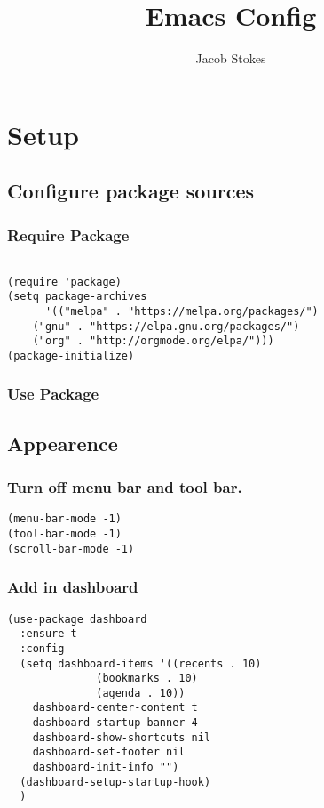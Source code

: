\documentclass[11pt]{article}
\author{Jacob Stokes}
\date{}
\title{Emacs Config}
\begin{document}
\maketitle
\tableofcontents

\section{Setup}
\label{sec:orgc369e85}
\subsection{Configure package sources}
\label{sec:orgfdca1f1}
\subsubsection{Require Package}
\label{sec:org8fe10ee}
\begin{verbatim}

(require 'package)
(setq package-archives
      '(("melpa" . "https://melpa.org/packages/")
	("gnu" . "https://elpa.gnu.org/packages/")
	("org" . "http://orgmode.org/elpa/")))
(package-initialize)
\end{verbatim}

\subsubsection{Use Package}
\label{sec:orgc85d260}
\subsection{Appearence}
\label{sec:orga21bd29}
\subsubsection{Turn off menu bar and tool bar.}
\label{sec:org0e2ca5e}
\begin{verbatim}
(menu-bar-mode -1)
(tool-bar-mode -1) 
(scroll-bar-mode -1)
\end{verbatim}
\subsubsection{Add in dashboard}
\label{sec:org1a01977}
\begin{verbatim}
(use-package dashboard
  :ensure t
  :config
  (setq dashboard-items '((recents . 10)
			  (bookmarks . 10)
			  (agenda . 10))
	dashboard-center-content t
	dashboard-startup-banner 4
	dashboard-show-shortcuts nil
	dashboard-set-footer nil
	dashboard-init-info "")        
  (dashboard-setup-startup-hook)
  )
\end{verbatim}
\end{document}
